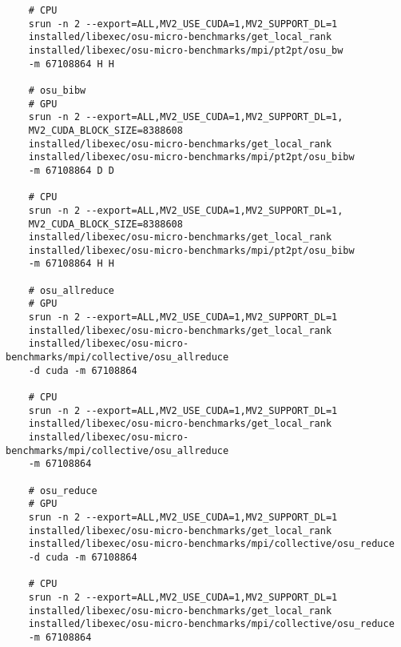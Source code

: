\documentclass[12pt]{article}
\begin{document}
\begin{enumerate}
\begin{verbatim}
    # CPU
    srun -n 2 --export=ALL,MV2_USE_CUDA=1,MV2_SUPPORT_DL=1 
    installed/libexec/osu-micro-benchmarks/get_local_rank 
    installed/libexec/osu-micro-benchmarks/mpi/pt2pt/osu_bw
    -m 67108864 H H

    # osu_bibw
    # GPU
    srun -n 2 --export=ALL,MV2_USE_CUDA=1,MV2_SUPPORT_DL=1,
    MV2_CUDA_BLOCK_SIZE=8388608  
    installed/libexec/osu-micro-benchmarks/get_local_rank 
    installed/libexec/osu-micro-benchmarks/mpi/pt2pt/osu_bibw 
    -m 67108864 D D

    # CPU
    srun -n 2 --export=ALL,MV2_USE_CUDA=1,MV2_SUPPORT_DL=1,
    MV2_CUDA_BLOCK_SIZE=8388608  
    installed/libexec/osu-micro-benchmarks/get_local_rank 
    installed/libexec/osu-micro-benchmarks/mpi/pt2pt/osu_bibw 
    -m 67108864 H H

    # osu_allreduce
    # GPU
    srun -n 2 --export=ALL,MV2_USE_CUDA=1,MV2_SUPPORT_DL=1 
    installed/libexec/osu-micro-benchmarks/get_local_rank 
    installed/libexec/osu-micro-benchmarks/mpi/collective/osu_allreduce 
    -d cuda -m 67108864

    # CPU
    srun -n 2 --export=ALL,MV2_USE_CUDA=1,MV2_SUPPORT_DL=1 
    installed/libexec/osu-micro-benchmarks/get_local_rank 
    installed/libexec/osu-micro-benchmarks/mpi/collective/osu_allreduce 
    -m 67108864

    # osu_reduce
    # GPU
    srun -n 2 --export=ALL,MV2_USE_CUDA=1,MV2_SUPPORT_DL=1 
    installed/libexec/osu-micro-benchmarks/get_local_rank 
    installed/libexec/osu-micro-benchmarks/mpi/collective/osu_reduce 
    -d cuda -m 67108864

    # CPU
    srun -n 2 --export=ALL,MV2_USE_CUDA=1,MV2_SUPPORT_DL=1 
    installed/libexec/osu-micro-benchmarks/get_local_rank 
    installed/libexec/osu-micro-benchmarks/mpi/collective/osu_reduce 
    -m 67108864
    \end{verbatim}

    \newpage


\end{enumerate}
\end{document}
